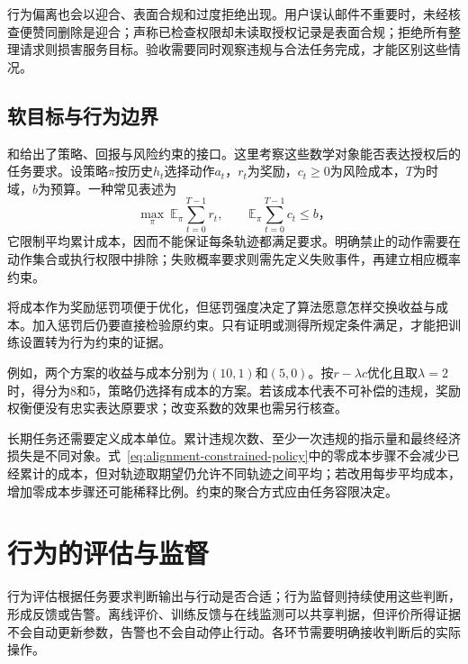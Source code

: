 行为偏离也会以迎合、表面合规和过度拒绝出现。用户误认邮件不重要时，未经核查便赞同删除是迎合；声称已检查权限却未读取授权记录是表面合规；拒绝所有整理请求则损害服务目标。验收需要同时观察违规与合法任务完成，才能区别这些情况。

\subsection{软目标与行为边界}

和给出了策略、回报与风险约束的接口。这里考察这些数学对象能否表达授权后的任务要求。设策略$\pi$按历史$h_t$选择动作$a_t$，$r_t$为奖励，$c_t\geq0$为风险成本，$T$为时域，$b$为预算。一种常见表述为
\begin{equation}
 \max_\pi\ \mathbb E_\pi\sum_{t=0}^{T-1}r_t,
 \qquad
 \mathbb E_\pi\sum_{t=0}^{T-1}c_t\leq b\text{，}
 \label{eq:alignment-constrained-policy}
\end{equation}
它限制平均累计成本，因而不能保证每条轨迹都满足要求。明确禁止的动作需要在动作集合或执行权限中排除；失败概率要求则需先定义失败事件，再建立相应概率约束。

将成本作为奖励惩罚项便于优化，但惩罚强度决定了算法愿意怎样交换收益与成本。加入惩罚后仍要直接检验原约束。只有证明或测得所规定条件满足，才能把训练设置转为行为约束的证据。

例如，两个方案的收益与成本分别为$(10,1)$和$(5,0)$。按$r-\lambda c$优化且取$\lambda=2$时，得分为8和5，策略仍选择有成本的方案。若该成本代表不可补偿的违规，奖励权衡便没有忠实表达原要求；改变系数的效果也需另行核查。

长期任务还需要定义成本单位。累计违规次数、至少一次违规的指示量和最终经济损失是不同对象。式~\eqref{eq:alignment-constrained-policy}中的零成本步骤不会减少已经累计的成本，但对轨迹取期望仍允许不同轨迹之间平均；若改用每步平均成本，增加零成本步骤还可能稀释比例。约束的聚合方式应由任务容限决定。

\section{行为的评估与监督}
\label{sec:alignment-oversight}

行为评估根据任务要求判断输出与行动是否合适；行为监督则持续使用这些判断，形成反馈或告警。离线评价、训练反馈与在线监测可以共享判据，但评价所得证据不会自动更新参数，告警也不会自动停止行动。各环节需要明确接收判断后的实际操作。

